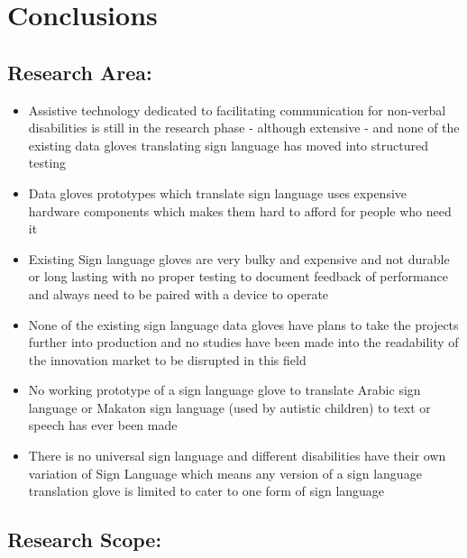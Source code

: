 \chapter{Conclusions}

\section{Research Area:}

\begin{itemize}
    \item Assistive technology dedicated to facilitating communication for non-verbal disabilities is still in the research phase - although extensive - and none of the existing data gloves translating sign language has moved into structured testing 
    \item Data gloves prototypes which translate sign language uses expensive hardware components which makes them hard to afford for people who need it 
    \item Existing Sign language gloves are very bulky and expensive and not durable or long lasting with no proper testing to document feedback of performance and always need to be paired with a device to operate 
    \item None of the existing sign language data gloves have plans to take the projects further into production and no studies have been made into the readability of the innovation market to be disrupted in this field 
    \item No working prototype of a sign language glove to translate Arabic sign language or Makaton sign language (used by autistic children) to text or speech has ever been made
    \item There is no universal sign language and different disabilities have their own variation of Sign Language which means any version of a sign language translation glove is limited to cater to one form of sign language 
\end{itemize}

\section{Research Scope:}

